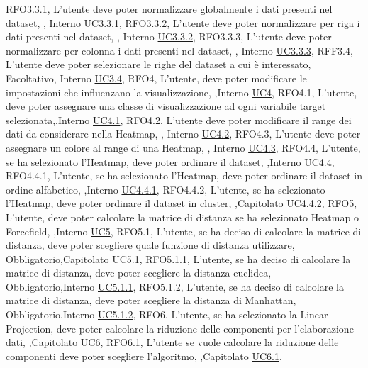 {    {RFO3.3.1, L'utente deve poter normalizzare globalmente i dati presenti nel dataset, \obb, Interno \noexpand\hyperref[uc3.3.1]{UC3.3.1}},
    {RFO3.3.2, L'utente deve poter normalizzare per riga i dati presenti nel dataset, \obb, Interno \noexpand\hyperref[uc3.3.2]{UC3.3.2}},
    {RFO3.3.3, L'utente deve poter normalizzare per colonna i dati presenti nel dataset, \obb, Interno \noexpand\hyperref[uc3.3.3]{UC3.3.3}},
    {RFF3.4, L'utente deve poter selezionare le righe del dataset a cui è interessato, Facoltativo, Interno \noexpand\hyperref[uc3.4]{UC3.4}},
    {RFO4, L'utente{,} deve poter modificare le impostazioni che influenzano la visualizzazione, \obb,Interno \noexpand\hyperref[uc4]{UC4}},
    {RFO4.1, L'utente{,} deve poter assegnare una classe di visualizzazione ad ogni variabile target selezionata,\obb,Interno \noexpand\hyperref[uc4.1]{UC4.1}},
    {RFO4.2, L'utente deve poter modificare il range dei dati da considerare nella Heatmap, \obb, Interno \noexpand\hyperref[uc4.2]{UC4.2}},
    {RFO4.3, L'utente deve poter assegnare un colore al range di una Heatmap, \obb, Interno \noexpand\hyperref[uc4.3]{UC4.3}},
    {RFO4.4, L'utente{,} se ha selezionato l'Heatmap{,} deve poter ordinare il dataset, \obb,Interno \noexpand\hyperref[uc4.4]{UC4.4}},
    {RFO4.4.1, L'utente{,} se ha selezionato l'Heatmap{,} deve poter ordinare il dataset in ordine alfabetico, \obb,Interno \noexpand\hyperref[uc4.4.1]{UC4.4.1}},
    {RFO4.4.2, L'utente{,} se ha selezionato l'Heatmap{,} deve poter ordinare il dataset in cluster, \obb,Capitolato \noexpand\hyperref[uc4.4.2]{UC4.4.2}},
    {RFO5, L'utente{,} deve poter calcolare la matrice di distanza se ha selezionato Heatmap o Forcefield, \obb,Interno \noexpand\hyperref[uc5]{UC5}},
    {RFO5.1, L'utente{,} se ha deciso di calcolare la matrice di distanza{,} deve poter scegliere quale funzione di distanza utilizzare, Obbligatorio,Capitolato \noexpand\hyperref[uc5.1]{UC5.1}},
    {RFO5.1.1, L'utente{,} se ha deciso di calcolare la matrice di distanza{,} deve poter scegliere la distanza euclidea, Obbligatorio,Interno \noexpand\hyperref[uc5.1.1]{UC5.1.1}},
    {RFO5.1.2, L'utente{,} se ha deciso di calcolare la matrice di distanza{,} deve poter scegliere la distanza di Manhattan, Obbligatorio,Interno \noexpand\hyperref[uc5.1.2]{UC5.1.2}},
    {RFO6, L'utente{,} se ha selezionato la Linear Projection{,} deve poter calcolare la riduzione delle componenti per l'elaborazione dati, \obb,Capitolato \noexpand\hyperref[uc6]{UC6}},
    {RFO6.1, L'utente se vuole calcolare la riduzione delle componenti deve poter scegliere l'algoritmo, \obb,Capitolato \noexpand\hyperref[uc6.1]{UC6.1}},
}
